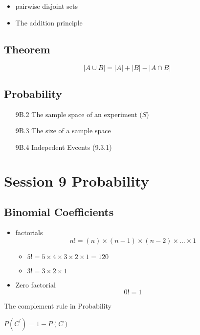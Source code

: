 \documentclass[]{report}
\begin{document}
				\begin{itemize}
					\item pairwise disjoint sets
					\item The addition principle
				\end{itemize}
				\subsection*{Theorem}
				\[ |A \cup B| = |A| + |B| - |A \cap B|  \]
				
				\subsection*{Probability}
				\begin{itemize}
					\item[9B.2] The sample space of an experiment ($S$)
					\item[9B.3] The size of a sample space
					\item[9B.4] Indepedent Evcents (9.3.1)
				\end{itemize}
				

\section*{Session 9 Probability}
\subsection*{Binomial Coefficients}
\begin{itemize}
	\item factorials 
	\[ n! = (n)\times (n-1)\times(n-2) \times \ldots \times 1 \]
	\begin{itemize}
		\item $5! = 5 \times 4 \times 3 \times 2 \times 1 = 120 $
		\item $3! = 3 \times 2 \times 1$
	\end{itemize}
	\item Zero factorial
	\[ 0! =  1 \]
\end{itemize}


The complement rule in Probability

$P(C^{\prime}) = 1- P(C)$
\end{document}
